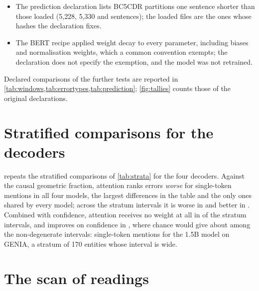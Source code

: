 \documentclass[11pt,a4paper]{article}
\begin{document}
\begin{itemize}
  and could not be run. It was replaced, before any result on that corpus was seen, by a copy of the template for the 12-layer model with only
  the corpus changed.
  \item The prediction declaration lists BC5CDR partitions one sentence shorter than those loaded (5{,}228, 5{,}330 and \bcNtest{} sentences);
  the loaded files are the ones whose hashes the declaration fixes.
  \item The BERT recipe applied weight decay to every parameter, including biases and normalisation weights, which a common convention exempts;
  the declaration does not specify the exemption, and the model was not retrained.
\end{itemize}

Declared comparisons of the further tests are reported in \cref{tab:windows,tab:errortypes,tab:prediction}; \cref{fig:tallies}
counts those of the original declarations.


\section{Stratified comparisons for the decoders}
\label{app:decoders}

 repeats the stratified comparisons of \cref{tab:strata} for the four decoders. Against the causal
geometric fraction, attention ranks errors \emph{worse} for single-token mentions in all four models, the largest
differences in the table and the only ones shared by every model; across the \decStrataCtwoN{} stratum intervals it is
worse in \decStrataCtwoAdv{} and better in \decStrataCtwoFav{}. Combined with confidence, attention receives no weight at
all in \decStrataCthreeZeroW{} of the \decStrataCthreeN{} stratum intervals, and improves on confidence in
\decStrataCthreeFav{}, where chance would give about \decStrataCthreeChance{} among the \decStrataCthreeNonDeg{}
non-degenerate intervals: single-token mentions for the 1.5B model on GENIA, a stratum of 170 entities whose interval is
wide.

\begin{table}[t]
\centering
\small
\caption{The stratified comparisons of \cref{tab:strata}, for the Qwen2.5 decoders fine-tuned on each corpus. The reference in
(a) is the causal geometric fraction (\cref{eq:closed}). Notation as in \cref{tab:strata}.}
\label{tab:strata-dec}

\end{table}

\section{The scan of readings}
\label{app:readings}
\end{document}
